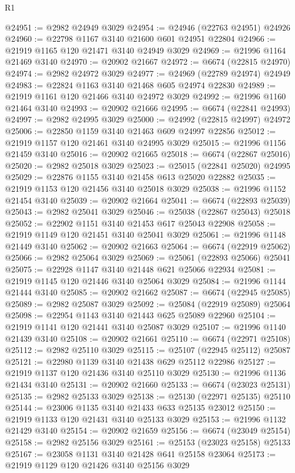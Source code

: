 \begin{lexlean}{R1}
\begin{coremodule}
@24951 := @2982 @24949 @3029
@24954 := @24946 (@22763 @24951) @24926
@24960 := @22798 @1167 @3140 @21600 @601 @24951 @22804
@24966 := @21919 @1165 @120 @21471 @3140 @24949 @3029
@24969 := @21996 @1164 @21469 @3140
@24970 := @20902 @21667
@24972 := @6674 (@22815 @24970)
@24974 := @2982 @24972 @3029
@24977 := @24969 (@22789 @24974) @24949
@24983 := @22824 @1163 @3140 @21468 @605 @24974 @22830
@24989 := @21919 @1161 @120 @21466 @3140 @24972 @3029
@24992 := @21996 @1160 @21464 @3140
@24993 := @20902 @21666
@24995 := @6674 (@22841 @24993)
@24997 := @2982 @24995 @3029
@25000 := @24992 (@22815 @24997) @24972
@25006 := @22850 @1159 @3140 @21463 @609 @24997 @22856
@25012 := @21919 @1157 @120 @21461 @3140 @24995 @3029
@25015 := @21996 @1156 @21459 @3140
@25016 := @20902 @21665
@25018 := @6674 (@22867 @25016)
@25020 := @2982 @25018 @3029
@25023 := @25015 (@22841 @25020) @24995
@25029 := @22876 @1155 @3140 @21458 @613 @25020 @22882
@25035 := @21919 @1153 @120 @21456 @3140 @25018 @3029
@25038 := @21996 @1152 @21454 @3140
@25039 := @20902 @21664
@25041 := @6674 (@22893 @25039)
@25043 := @2982 @25041 @3029
@25046 := @25038 (@22867 @25043) @25018
@25052 := @22902 @1151 @3140 @21453 @617 @25043 @22908
@25058 := @21919 @1149 @120 @21451 @3140 @25041 @3029
@25061 := @21996 @1148 @21449 @3140
@25062 := @20902 @21663
@25064 := @6674 (@22919 @25062)
@25066 := @2982 @25064 @3029
@25069 := @25061 (@22893 @25066) @25041
@25075 := @22928 @1147 @3140 @21448 @621 @25066 @22934
@25081 := @21919 @1145 @120 @21446 @3140 @25064 @3029
@25084 := @21996 @1144 @21444 @3140
@25085 := @20902 @21662
@25087 := @6674 (@22945 @25085)
@25089 := @2982 @25087 @3029
@25092 := @25084 (@22919 @25089) @25064
@25098 := @22954 @1143 @3140 @21443 @625 @25089 @22960
@25104 := @21919 @1141 @120 @21441 @3140 @25087 @3029
@25107 := @21996 @1140 @21439 @3140
@25108 := @20902 @21661
@25110 := @6674 (@22971 @25108)
@25112 := @2982 @25110 @3029
@25115 := @25107 (@22945 @25112) @25087
@25121 := @22980 @1139 @3140 @21438 @629 @25112 @22986
@25127 := @21919 @1137 @120 @21436 @3140 @25110 @3029
@25130 := @21996 @1136 @21434 @3140
@25131 := @20902 @21660
@25133 := @6674 (@23023 @25131)
@25135 := @2982 @25133 @3029
@25138 := @25130 (@22971 @25135) @25110
@25144 := @23006 @1135 @3140 @21433 @633 @25135 @23012
@25150 := @21919 @1133 @120 @21431 @3140 @25133 @3029
@25153 := @21996 @1132 @21429 @3140
@25154 := @20902 @21659
@25156 := @6674 (@23049 @25154)
@25158 := @2982 @25156 @3029
@25161 := @25153 (@23023 @25158) @25133
@25167 := @23058 @1131 @3140 @21428 @641 @25158 @23064
@25173 := @21919 @1129 @120 @21426 @3140 @25156 @3029

\end{coremodule}
\end{lexlean}
